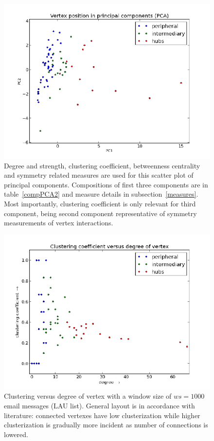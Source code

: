 \documentclass[%
 aip,
 jmp,%
 amsmath,amssymb,
 reprint,%
]{revtex4-1}
\begin{document}
\begin{figure} 
   \centering
        \includegraphics[width=\columnwidth]{figs/ev0pr1PCA}
    \caption{Degree and strength, clustering coefficient, betweenness centrality and symmetry related measures are used for this scatter plot of principal components. Compositions of first three components are in table~\ref{compPCA2} and measure details in subsection~\ref{measures}. Most importantly, clustering coefficient is only relevant for third component, being second component representative of symmetry measurements of vertex interactions.}
    \label{PCA2}
\end{figure}


\begin{figure} 
   \centering
        \includegraphics[width=\columnwidth]{figs/ev0pr11CC}
    \caption{Clustering versus degree of vertex with a window size of $ws = 1000$ email messages (LAU list). General layout is in accordance with literature: connected vertexes have low clusterization while higher clusterization is gradually more incident as number of connections is lowered.}
    \label{clust}
\end{figure}
\end{document}
